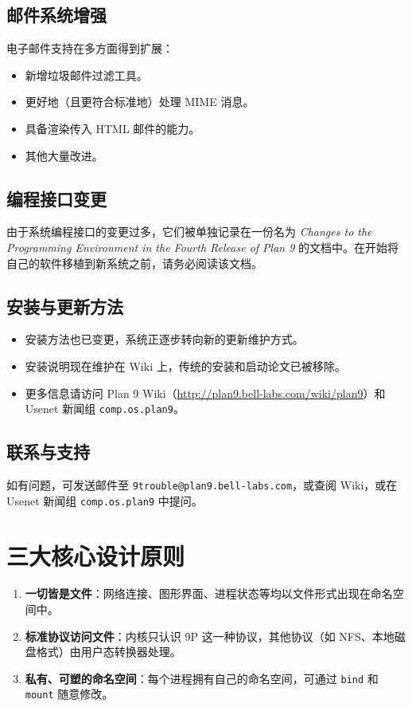 \documentclass[12pt,UTF8]{ctexbook}
\begin{document}
\subsection{邮件系统增强}

电子邮件支持在多方面得到扩展：

\begin{itemize}
\item 新增垃圾邮件过滤工具。
\item 更好地（且更符合标准地）处理 MIME 消息。
\item 具备渲染传入 HTML 邮件的能力。
\item 其他大量改进。
\end{itemize}

\subsection{编程接口变更}

由于系统编程接口的变更过多，它们被单独记录在一份名为 \textit{Changes to the Programming Environment in the Fourth Release of Plan 9} 的文档中。在开始将自己的软件移植到新系统之前，请务必阅读该文档。

\subsection{安装与更新方法}

\begin{itemize}
\item 安装方法也已变更，系统正逐步转向新的更新维护方式。
\item 安装说明现在维护在 Wiki 上，传统的安装和启动论文已被移除。
\item 更多信息请访问 Plan 9 Wiki（\url{http://plan9.bell-labs.com/wiki/plan9}）和 Usenet 新闻组 \texttt{comp.os.plan9}。
\end{itemize}

\subsection{联系与支持}

如有问题，可发送邮件至 \texttt{9trouble@plan9.bell-labs.com}，或查阅 Wiki，或在 Usenet 新闻组 \texttt{comp.os.plan9} 中提问。
	
\section{三大核心设计原则}

\begin{enumerate}
\item \textbf{一切皆是文件}：网络连接、图形界面、进程状态等均以文件形式出现在命名空间中。
\item \textbf{标准协议访问文件}：内核只认识 9P 这一种协议，其他协议（如 NFS、本地磁盘格式）由用户态转换器处理。
\item \textbf{私有、可塑的命名空间}：每个进程拥有自己的命名空间，可通过 \texttt{bind} 和 \texttt{mount} 随意修改。
\end{enumerate}
	
\end{document}
